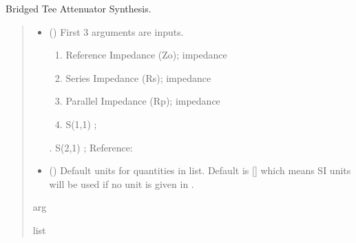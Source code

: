 \documentclass[letterpaper,10pt,english]{sphinxmanual}
\begin{document}

\begin{fulllineitems}
\label{\detokenize{components:components.Bridged_Tee_Attenuator_Synthesis}}
\pysigstartsignatures
{}
\pysigstopsignatures
\sphinxAtStartPar
Bridged Tee Attenuator Synthesis.
\begin{quote}\begin{description}
\begin{itemize}
\item {} 
\sphinxAtStartPar
{} () \textendash{} 
\sphinxAtStartPar
First 3 arguments are inputs.
\begin{enumerate}
%
\item {} 
\sphinxAtStartPar
Reference Impedance (Zo); impedance

\item {} 
\sphinxAtStartPar
Series Impedance (Rs); impedance

\item {} 
\sphinxAtStartPar
Parallel Impedance (Rp); impedance

\item {} 
\sphinxAtStartPar
S(1,1) ;

\end{enumerate}

. S(2,1) ;
Reference:


\item {} 
\sphinxAtStartPar
{} (\sphinxstyleliteralemphasis{\sphinxupquote{, }}) \textendash{} Default units for quantities in  list. Default is {[}{]} which means SI units will be used if no unit is given in .

\end{itemize}

\sphinxAtStartPar
arg

\sphinxAtStartPar
list

\end{description}\end{quote}

\end{fulllineitems}
\end{document}
